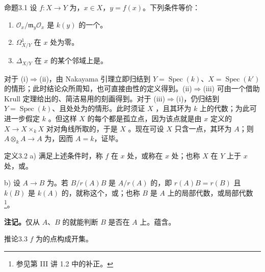 \begin{SGAresult}{命题}{3.1}
设 $f\colon X\to Y$ 为，$x\in X$，$y=f(x)$。下列条件等价：
\begin{enumerate}
\item[(i)] $\mathcal O_x/\mathfrak m_y\mathcal O_x$ 是 $k(y)$ 的一个。
\item[(ii)] $\Omega^1_{X/Y}$ 在 $x$ 处为零。
\item[(iii)]  $\Delta_{X/Y}$ 在 $x$ 的某个邻域上是。
\end{enumerate}
\end{SGAresult}
对于 (i)$\Rightarrow$(ii)，由 Nakayama 引理立即归结到 $Y=\operatorname{Spec}(k)$、$X=\operatorname{Spec}(k')$ 的情形；此时结论众所周知，也可直接由性的定义得到。(ii)$\Rightarrow$(iii) 可由一个借助 Krull 定理给出的、简洁易用的刻画得到。对于 (iii)$\Rightarrow$(i)，仍归结到 $Y=\operatorname{Spec}(k)$、且处处为的情形。此时须证 $X$ ，且其环为 $k$ 上的代数；为此可进一步假定 $k$ 。但这样 $X$ 的每个都是孤立点，因为该点就是由 $x$ 定义的 $X\to X\times_k X$ 对对角线所取的，于是 $X$ 。现在可设 $X$ 只含一点，其环为 $A$；则 $A\otimes_k A\to A$ 为，因而 $A=k$，证毕。
\begin{SGAresult}{定义}{3.2}
a) 满足上述条件时，称 $f$ 在 $x$ 处，或称在 $x$ 处；也称 $X$ 在 $Y$ 上于 $x$ 处，或。

b) 设 $A\to B$ 为。若 $B/r(A)B$ 是 $A/r(A)$ 的，即 $r(A)B=r(B)$ 且 $k(B)$ 是 $k(A)$ 的，就称这个，或；也称 $B$ 是 $A$ 上的局部代数，或局部代数\footnote{参见第 III 讲 1.2 中的补正。}。
\end{SGAresult}
\textbf{注记。}仅从 $A$、$B$ 的就能判断 $B$ 是否在 $A$ 上。蕴含。
\begin{SGAresult}{推论}{3.3}
$f$ 为的点构成开集。
\end{SGAresult}

